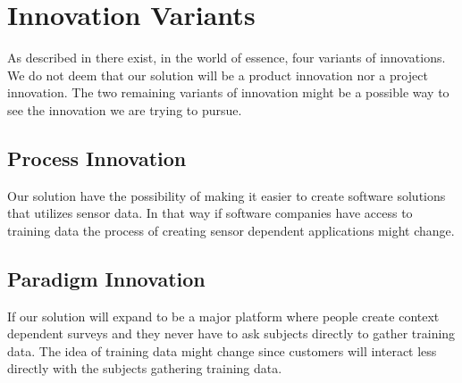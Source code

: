 
\section{Innovation Variants}
\label{sec:innovation_variants}

As described in  there exist, in the world of essence, four variants of innovations. We do not deem that our solution will be a product innovation nor a project innovation. The two remaining variants of innovation might be a possible way to see the innovation we are trying to pursue.

\subsection{Process Innovation}
\label{sub:process_innovation}

Our solution have the possibility of making it easier to create software solutions that utilizes sensor data. In that way if software companies have access to training data the process of creating sensor dependent applications might change.

\subsection{Paradigm Innovation}
\label{sub:paradigm_innovation}

If our solution will expand to be a major platform where people create context dependent surveys and they never have to ask subjects directly to gather training data. The idea of training data might change since customers will interact less directly with the subjects gathering training data.